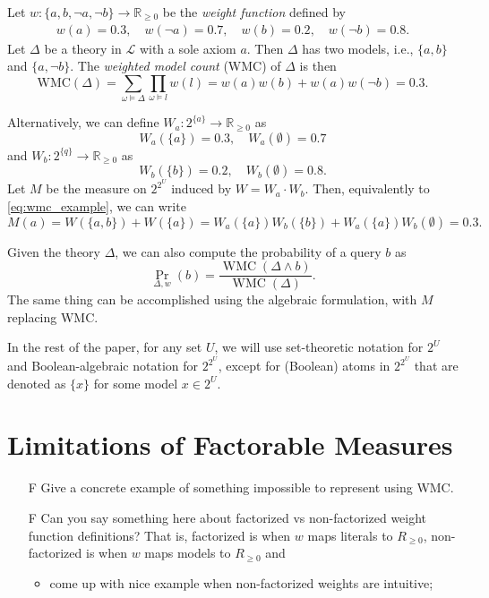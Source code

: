 \documentclass{article}
\theoremstyle{definition}
\theoremstyle{remark}
\DeclareMathOperator{\WMC}{WMC}
\begin{document}
Let $w\colon \{ a, b, \neg a, \neg b \} \to \mathbb{R}_{\ge 0}$
be the \emph{weight function} defined by
\begin{align*}
  w(a) = 0.3, \quad w(\neg a) = 0.7, \quad w(b) = 0.2, \quad w(\neg b) = 0.8.
\end{align*}
Let $\Delta$ be a theory in $\mathcal{L}$ with a sole axiom $a$. Then
$\Delta$ has two models, i.e., $\{ a, b \}$ and $\{ a, \neg b \}$. The
\emph{weighted model count} (WMC) \cite{DBLP:journals/ai/ChaviraD08} of
$\Delta$ is then
\begin{equation} \label{eq:wmc_example}
  \mathrm{WMC}(\Delta) = \sum_{\omega \models \Delta} \prod_{\omega \models l} w(l) = w(a)w(b) + w(a)w(\neg b) = 0.3.
\end{equation}

Alternatively, we can define $W_a\colon 2^{\{a\}} \to \mathbb{R}_{\ge 0}$ as
\[
  W_a(\{ a \}) = 0.3, \quad W_a(\emptyset) = 0.7
\]
and $W_b\colon 2^{\{q\}} \to \mathbb{R}_{\ge 0}$ as
\[
  W_b(\{ b \}) = 0.2, \quad W_b(\emptyset) = 0.8.
\]
Let $M$ be the measure on $2^{2^U}$ induced by $W = W_a \cdot W_b$. Then,
equivalently to \cref{eq:wmc_example}, we can write
\[
  M(a) = W(\{ a, b \}) + W(\{ a \}) = W_a(\{a\})W_b(\{b\}) +
  W_a(\{a\})W_b(\emptyset) = 0.3.
\]

Given the theory $\Delta$, we can also compute the probability of a query $b$ as
\cite{DBLP:conf/uai/Belle17,DBLP:conf/aaai/SangBK05}
\[
  \Pr_{\Delta, w}(b) = \frac{\WMC(\Delta \land b)}{\WMC(\Delta)}.
\]
The same thing can be accomplished using the algebraic formulation, with $M$
replacing $\mathrm{WMC}$.

In the rest of the paper, for any set $U$, we will use set-theoretic notation
for $2^U$ and Boolean-algebraic notation for $2^{2^U}$, except for (Boolean)
atoms in $2^{2^U}$ that are denoted as $\{x\}$ for some model $x \in 2^U$.

\section{Limitations of Factorable Measures}

\begin{itemize}
\item[F] Give a concrete example of something impossible to represent using WMC.
\item[F] Can you say something here about factorized vs non-factorized
  weight function definitions? That is, factorized is when $w$ maps literals to
  $R_{\ge 0}$, non-factorized is when $w$ maps models to $R_{\ge 0}$ and
  \begin{itemize}
  \item come up with nice example when non-factorized weights are intuitive;
  \end{itemize}
\end{itemize}
\end{document}
